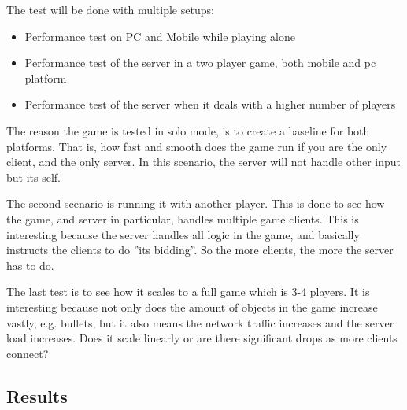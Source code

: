 The test will be done with multiple setups:
\begin{itemize}
\item Performance test on PC and Mobile while playing alone
\item Performance test of the server in a two player game, both mobile and pc platform
\item Performance test of the server when it deals with a higher number of players
\end{itemize}

The reason the game is tested in solo mode, is to create a baseline for both platforms. That is, how fast and smooth does the game run if you are the only client, and the only server. In this scenario, the server will not handle other input but its self.

The second scenario is running it with another player. This is done to see how the game, and server in particular, handles multiple game clients. This is interesting because the server handles all logic in the game, and basically instructs the clients to do ''its bidding''. So the more clients, the more the server has to do. 

The last test is to see how it scales to a full game which is 3-4 players. It is interesting because not only does the amount of objects in the game increase vastly, e.g. bullets, but it also means the network traffic increases and the server load increases. Does it scale linearly or are there significant drops as more clients connect?

\subsection{Results}
